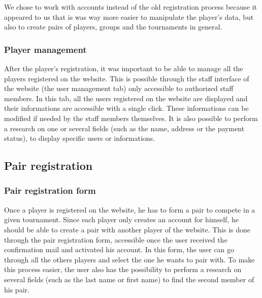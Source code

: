 We chose to work with accounts instead of the old registration process because
it appeared to us that is was way more easier to manipulate the player's data,
but also to create pairs of players, groups and the tournaments in general.

\subsubsection{Player management}
\label{subs:Player management}


After the player's registration, it was important to be able to manage all the
players registered on the website. This is possible through the staff interface
of the website (the user management tab) only accessible to authorized staff
members. In this tab, all the users registered on the website are displayed and
their informations are accessible with a single click. These informations can
be modified if needed by the staff members themselves. It is also possible to
perform a research on one or several fields (such as the name, address or the
payment status), to display specific users or informations.

\subsection{Pair registration}
\label{sub:Pair registration}

\subsubsection{Pair registration form}
\label{subs:Pair registration form}


Once a player is registered on the website, he has to form a pair to compete in
a given tournament. Since each player only creates an account for himself, he
should be able to create a pair with another player of the website. This is
done through the pair registration form, accessible once the user received the
confirmation mail and activated his account. In this form, the user can go
through all the others players and select the one he wants to pair with. To
make this process easier, the user also has the possibility to perform a
research on several fields (such as the last name or first name) to find the
second member of his pair. \newline

